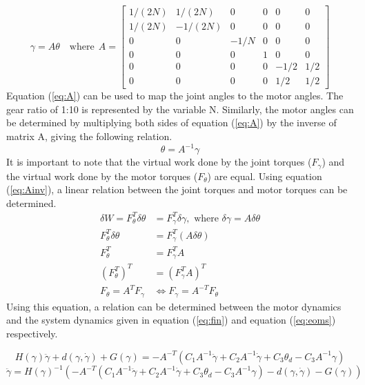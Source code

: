 \begin{equation}
  \gamma = A\theta\quad \text{where}~~A=\left[\begin{array}{cccccc}{1 /(2 N)} & {1 /(2 N)} & {0} & {0} & {0} & {0} \\ {1 /(2 N)} & {-1 /(2 N)} & {0} & {0} & {0} & {0} \\ {0} & {0} & {-1 / N} & {0} & {0} & {0} \\ {0} & {0} & {0} & {1} & {0} & {0} \\ {0} & {0} & {0} & {0} & {-1 / 2} & {1 / 2} \\ {0} & {0} & {0} & {0} & {1 / 2} & {1 / 2}\end{array}\right]
\label{eq:A}
\end{equation}
Equation (\ref{eq:A}) can be used to map the joint angles to the motor angles. The gear ratio of 1:10 is represented by the variable N. Similarly, the motor angles can be determined by multiplying both sides of equation (\ref{eq:A}) by the inverse of matrix A, giving the following relation.
\begin{equation}
\theta=A^{-1} \gamma
\label{eq:Ainv}
\end{equation}
It is important to note that the virtual work done by the joint torques ($F_{\gamma}$) and the virtual work done by the motor torques ($F_{\theta}$) are equal. Using equation (\ref{eq:Ainv}), a linear relation between the joint torques and motor torques can be determined.
\[
\begin{aligned}
  \delta W = F_{\theta}^{T} \delta \theta&=F_{\gamma}^{T} \delta \gamma, \text { where } \delta \gamma=A \delta \theta \\
  F_{\theta}^{T} \delta \theta &= F_{\gamma}^{T}(A \delta \theta) \\
  F_{\theta}^{T}&=F_{\gamma}^{T} A\\
  \left(F_{\theta}^{T}\right)^{T}&=\left(F_{\gamma}^{T} A\right)^{T}\\
  F_{\theta}=A^{T} F_{\gamma} &\Leftrightarrow F_{\gamma}=A^{-T} F_{\theta}\qquad\quad
\end{aligned}
\]
Using this equation, a relation can be determined between the motor dynamics and the system dynamics given in equation (\ref{eq:fin}) and equation (\ref{eq:eoms}) respectively.

\[
H(\gamma) \ddot{\gamma}+d(\gamma, \dot{\gamma})+G(\gamma)=-A^{-T}\left(C_1A^{-1} \ddot{\gamma}+C_2 A^{-1} \dot{\gamma}+C_3 \theta_{d}- C_3A^{-1} \gamma\right)
\]
\begin{equation}
\ddot{\gamma}=H(\gamma)^{-1}\left(-A^{-T}\left(C_1 A^{-1} \ddot{\gamma}+C_2 A^{-1} \dot{\gamma}+C_3 \theta_{d}-C_3A^{-1} \gamma\right)-d(\gamma, \dot{\gamma})-G(\gamma)\right)
\label{eq:gddot}
\end{equation}


